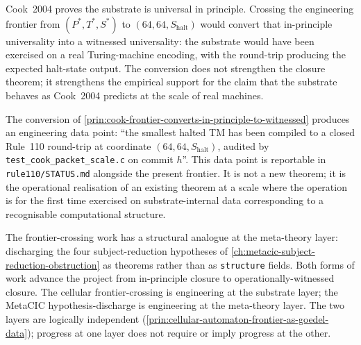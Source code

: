 \begin{principle}
\label{prin:cook-frontier-converts-in-principle-to-witnessed}
Cook~2004 proves the substrate is universal in principle. Crossing the engineering frontier from $(P^*, T^*, S^*)$ to $(64, 64, S_{\mathrm{halt}})$ would convert that in-principle universality into a witnessed universality: the substrate would have been exercised on a real Turing-machine encoding, with the round-trip producing the expected halt-state output. The conversion does not strengthen the closure theorem; it strengthens the empirical support for the claim that the substrate behaves as Cook~2004 predicts at the scale of real machines.
\end{principle}

\begin{principle}
\label{prin:cook-frontier-witnessed-is-data}
The conversion of \autoref{prin:cook-frontier-converts-in-principle-to-witnessed} produces an engineering data point: ``the smallest halted TM has been compiled to a closed Rule~110 round-trip at coordinate $(64, 64, S_{\mathrm{halt}})$, audited by \texttt{test\_cook\_packet\_scale.c} on commit $h$''. This data point is reportable in \texttt{rule110/STATUS.md} alongside the present frontier. It is not a new theorem; it is the operational realisation of an existing theorem at a scale where the operation is for the first time exercised on substrate-internal data corresponding to a recognisable computational structure.
\end{principle}

\begin{remark}
\label{rem:cook-frontier-comparison-with-metacic-barrier}
The frontier-crossing work has a structural analogue at the meta-theory layer: discharging the four subject-reduction hypotheses of \autoref{ch:metacic-subject-reduction-obstruction} as theorems rather than as \texttt{structure} fields. Both forms of work advance the project from in-principle closure to operationally-witnessed closure. The cellular frontier-crossing is engineering at the substrate layer; the MetaCIC hypothesis-discharge is engineering at the meta-theory layer. The two layers are logically independent (\autoref{prin:cellular-automaton-frontier-as-goedel-data}); progress at one layer does not require or imply progress at the other.
\end{remark}

